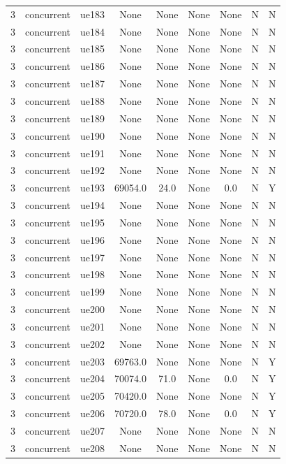 \begin{table}[ht]
\begin{tabular}{|c|c|c|c|c|c|c|c|c|}
3 & concurrent & ue183 & None & None & None & None & N & N \\
3 & concurrent & ue184 & None & None & None & None & N & N \\
3 & concurrent & ue185 & None & None & None & None & N & N \\
3 & concurrent & ue186 & None & None & None & None & N & N \\
3 & concurrent & ue187 & None & None & None & None & N & N \\
3 & concurrent & ue188 & None & None & None & None & N & N \\
3 & concurrent & ue189 & None & None & None & None & N & N \\
3 & concurrent & ue190 & None & None & None & None & N & N \\
3 & concurrent & ue191 & None & None & None & None & N & N \\
3 & concurrent & ue192 & None & None & None & None & N & N \\
3 & concurrent & ue193 & 69054.0 & 24.0 & None & 0.0 & N & Y \\
3 & concurrent & ue194 & None & None & None & None & N & N \\
3 & concurrent & ue195 & None & None & None & None & N & N \\
3 & concurrent & ue196 & None & None & None & None & N & N \\
3 & concurrent & ue197 & None & None & None & None & N & N \\
3 & concurrent & ue198 & None & None & None & None & N & N \\
3 & concurrent & ue199 & None & None & None & None & N & N \\
3 & concurrent & ue200 & None & None & None & None & N & N \\
3 & concurrent & ue201 & None & None & None & None & N & N \\
3 & concurrent & ue202 & None & None & None & None & N & N \\
3 & concurrent & ue203 & 69763.0 & None & None & None & N & Y \\
3 & concurrent & ue204 & 70074.0 & 71.0 & None & 0.0 & N & Y \\
3 & concurrent & ue205 & 70420.0 & None & None & None & N & Y \\
3 & concurrent & ue206 & 70720.0 & 78.0 & None & 0.0 & N & Y \\
3 & concurrent & ue207 & None & None & None & None & N & N \\
3 & concurrent & ue208 & None & None & None & None & N & N \\

\end{tabular}
\end{table}
